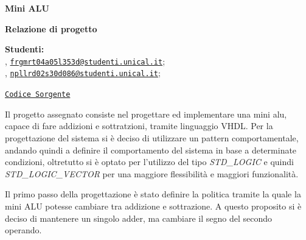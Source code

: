 



\usepackage{listings}
\usepackage{xcolor}





\begin{Large}
    \textsf{\textbf{Mini ALU}}\\
\end{Large}
\textbf{Relazione di progetto}

\vspace{1ex}

\textsf{\textbf{Studenti:}} \\
, \href{frgmrt04a05l353d@studenti.unical.it}{\texttt{frgmrt04a05l353d@studenti.unical.it}};\\
, \href{npllrd02s30d086@studenti.unical.it} {\texttt{npllrd02s30d086@studenti.unical.it}};

\href{https://github.com/Zi0LEO/elettronica_digitale}{\texttt{Codice Sorgente}}


\vspace{2ex}

Il progetto assegnato consiste nel progettare ed implementare una mini alu, capace di fare addizioni e sottratzioni, tramite linguaggio VHDL.
Per la progettazione del sistema si è deciso di utilizzare un pattern comportamentale, andando quindi a definire il comportamento del sistema in base a determinate condizioni, oltretutto si è optato per l'utilizzo del tipo \textit{STD\_LOGIC} e quindi \textit{STD\_LOGIC\_VECTOR} per una maggiore flessibilità e maggiori funzionalità.

Il primo passo della progettazione è stato definire la politica tramite la quale la mini ALU potesse cambiare tra addizione e sottrazione. A questo proposito si è deciso di mantenere un singolo adder, ma cambiare
il segno del secondo operando.

